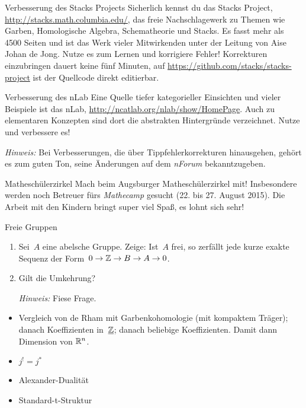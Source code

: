\documentclass{uebblatt}
\begin{document}

\begin{aufgabe}{Verbesserung des Stacks Projects}
Sicherlich kennst du das Stacks Project,
\url{http://stacks.math.columbia.edu/}, das freie Nachschlagewerk zu Themen wie
Garben, Homologische Algebra, Schematheorie und Stacks. Es fasst mehr als 4500
Seiten und ist das Werk vieler Mitwirkenden unter der Leitung von Aise Johan de
Jong. Nutze es zum Lernen und korrigiere Fehler! Korrekturen einzubringen
dauert keine fünf Minuten, auf \url{https://github.com/stacks/stacks-project}
ist der Quellcode direkt editierbar.
\end{aufgabe}

\begin{aufgabe}{Verbesserung des nLab}
Eine Quelle tiefer kategorieller Einsichten und vieler Beispiele ist das nLab,
\url{http://ncatlab.org/nlab/show/HomePage}. Auch zu elementaren Konzepten sind
dort die abstrakten Hintergründe verzeichnet. Nutze und verbessere es!

{\tiny\emph{Hinweis:} Bei Verbesserungen, die über Tippfehlerkorrekturen
hinausgehen, gehört es zum guten Ton, seine Änderungen auf dem \emph{nForum}
bekanntzugeben.\par}
\end{aufgabe}

\begin{aufgabe}{Matheschülerzirkel}
Mach beim Augsburger Matheschülerzirkel mit! Insbesondere werden noch Betreuer
fürs \emph{Mathecamp} gesucht (22. bis 27. August 2015). Die Arbeit mit den
Kindern bringt super viel Spaß, es lohnt sich sehr!
\end{aufgabe}

\begin{aufgabe}{Freie Gruppen}
\begin{enumerate}
\item Sei~$A$ eine abelsche Gruppe. Zeige: Ist~$A$ frei, so zerfällt jede kurze
exakte Sequenz der Form~$0 \to \mathbb{Z} \to B \to A \to 0$.
\item Gilt die Umkehrung? {\tiny\emph{Hinweis:} Fiese Frage.\par}
\end{enumerate}
\end{aufgabe}

\begin{itemize}
\item Vergleich von de Rham mit Garbenkohomologie (mit kompaktem Träger);
danach Koeffizienten in~$\underline{\mathbb{Z}}$; danach beliebige Koeffizienten. Damit dann
Dimension von $\mathbb{R}^n$.
\item $j^! = j^*$
\item Alexander-Dualität
\item Standard-t-Struktur
\end{itemize}
\end{document}
